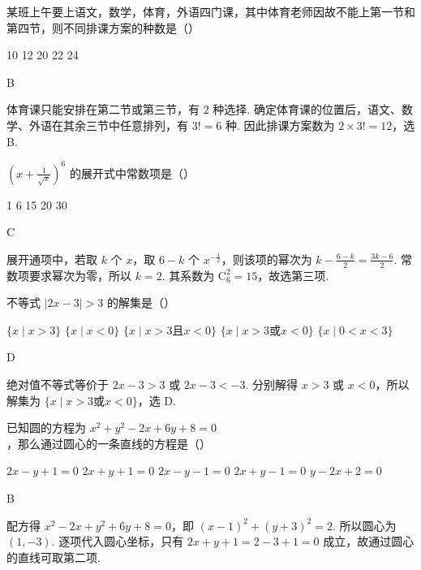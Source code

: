 \begin{problem}

某班上午要上语文，数学，体育，外语四门课，其中体育老师因故不能上第一节和第四节，则不同排课方案的种数是（\quad）

\choicesfive
    {10}
    {12}
    {20}
    {22}
    {24}
\begin{answer}
B
\end{answer}

\begin{solution}
体育课只能安排在第二节或第三节，有 \(2\) 种选择. 确定体育课的位置后，语文、数学、外语在其余三节中任意排列，有 \(3!=6\) 种. 因此排课方案数为 \(2\times3!=12\)，选 B.
\end{solution}
\end{problem}

\begin{problem}

\(\left(x + \frac{1}{\sqrt{x}}\right)^6\) 的展开式中常数项是（\quad）

\choicesfive
    {1}
    {6}
    {15}
    {20}
    {30}
\begin{answer}
C
\end{answer}

\begin{solution}
展开通项中，若取 \(k\) 个 \(x\)，取 \(6-k\) 个 \(x^{-\frac{1}{2}}\)，则该项的幂次为
\(k-\frac{6-k}{2}=\frac{3k-6}{2}\). 常数项要求幂次为零，所以 \(k=2\). 其系数为 \(\mathrm C_6^2=15\)，故选第三项.
\end{solution}
\end{problem}

\begin{problem}

不等式 \(|2x-3|>3 \) 的解集是（\quad）

\choicesfive
    {\(\{x\mid x>3\} \)}
    {\(\{x\mid x<0\} \)}
    {\(\{x\mid x>3 \text{且} x<0\}\)}
    {\(\{x\mid x>3\text{或}x<0\} \)}
    {\(\{x\mid 0<x<3\} \)}
\begin{answer}
D
\end{answer}

\begin{solution}
绝对值不等式等价于
\(2x-3>3\) 或 \(2x-3<-3\). 分别解得 \(x>3\) 或 \(x<0\)，所以解集为 \(\{x\mid x>3\text{或}x<0\}\)，选 D.
\end{solution}
\end{problem}

\begin{problem}

已知圆的方程为 \(x^{2} + y^{2} - 2x + 6y + 8 = 0\)，那么通过圆心的一条直线的方程是（\quad）

\choicesfive
    {\(2x - y + 1 = 0\)}
    {\(2x + y + 1 = 0\)}
    {\(2x - y - 1 = 0\)}
    {\(2x + y - 1 = 0\)}
    {\(y - 2x + 2 = 0\)}
\begin{answer}
B
\end{answer}

\begin{solution}
配方得 \(x^{2}-2x+y^{2}+6y+8=0\)，即 \((x-1)^{2}+(y+3)^{2}=2\). 所以圆心为 \((1,-3)\). 逐项代入圆心坐标，只有 \(2x+y+1=2-3+1=0\) 成立，故通过圆心的直线可取第二项.
\end{solution}
\end{problem}

